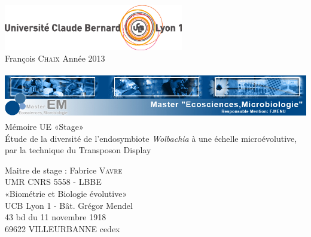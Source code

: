 \documentclass[a4paper, 12pt, oneside]{article}
\begin{document}
\pagestyle{empty} %

\setcounter{page}{0} %
 
\hfill
\includegraphics[height=2cm]{logo.eps}\\

\LARGE François \textsc{Chaix} \hfill Année 2013


 
\vspace{2cm}
 
 
\begin{center}
\includegraphics[height=2cm]{bandeau-portail.jpg}
\vspace{1cm}
\Huge Mémoire UE «Stage»\\
\vspace{1cm}
\Huge Étude de la diversité de l’endosymbiote \textit{Wolbachia} à une échelle microévolutive, par la technique du Transposon Display
\end{center}

\vfill
\noindent %
\Large Maitre de stage : Fabrice \textsc{Vavre}\\

\vspace{1cm}
\noindent
UMR CNRS 5558 - LBBE\\
«Biométrie et Biologie évolutive»\\
UCB Lyon 1  - Bât. Grégor Mendel\\
43 bd du 11 novembre 1918\\
69622 VILLEURBANNE cedex\\
\end{document}
